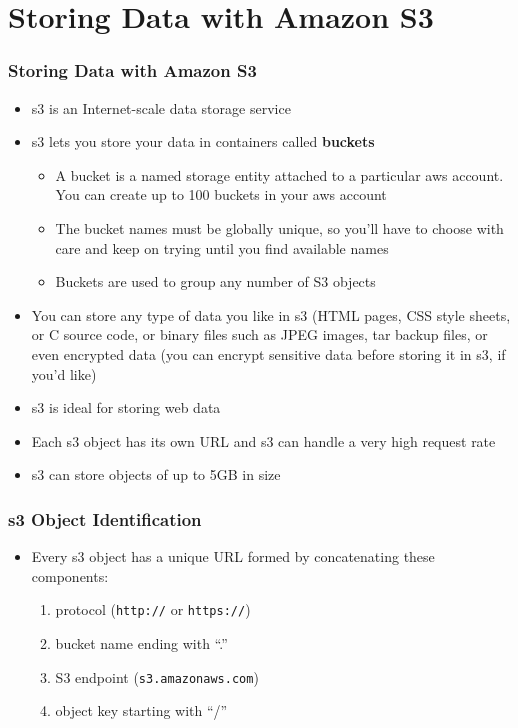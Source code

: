 \documentclass{beamer}
\begin{document}
\section{Storing Data with Amazon S3}
\begin{frame}
\frametitle{Storing Data with Amazon S3}
\begin{itemize}
 \item \acrfull{s3} is an Internet-scale data storage service
 \item \acrshort{s3} lets you store your data in containers called \textbf{buckets}
  \begin{itemize}
 \item A bucket is a named storage entity attached to a particular \acrshort{aws} account. You can create up to 100 buckets in your \acrshort{aws} account
 \item The bucket names must be globally unique, so you’ll have to choose with care and keep on trying until you find available names
 \item Buckets are used to group any number of S3 objects
\end{itemize}
 \item You can store any type of data you like in \acrshort{s3} (HTML pages, CSS style sheets, or C source code, or binary files such as JPEG images, tar
backup files, or even encrypted data (you can encrypt sensitive data before storing
it in \acrshort{s3}, if you’d like)
 \item \acrshort{s3} is ideal for storing web data
 \item Each \acrshort{s3} object has its own URL and \acrshort{s3} can handle a very high request rate
\item \acrshort{s3} can store objects of up to 5GB in size

\end{itemize}
\end{frame}

\begin{frame}[fragile]
\frametitle{\acrshort{s3} Object Identification}
\begin{itemize}
\item Every \acrshort{s3} object has a unique URL formed by concatenating these components:
\begin{enumerate}
\item protocol (\texttt{http://} or \texttt{https://})
\item bucket name ending with ``.''
\item S3 endpoint (\texttt{s3.amazonaws.com})
\item object key starting with ``/''
\end{enumerate}
\end{itemize}

\end{frame}
\end{document}
